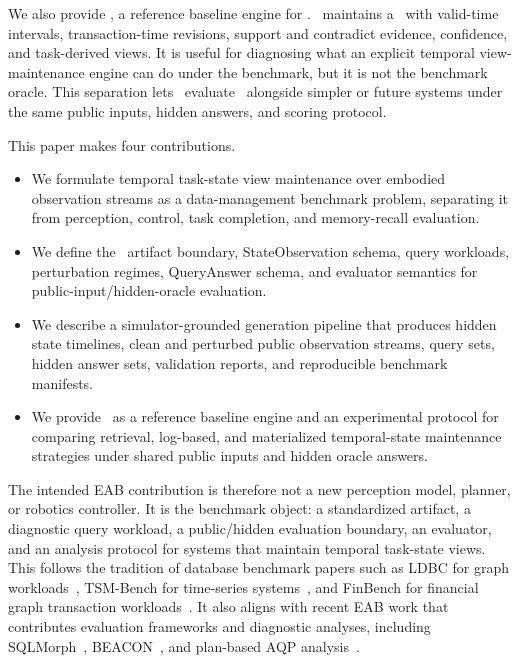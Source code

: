 We also provide \engine, a reference baseline engine for \bench. \engine\ maintains a \tsv\ with valid-time intervals, transaction-time revisions, support and contradict evidence, confidence, and task-derived views. It is useful for diagnosing what an explicit temporal view-maintenance engine can do under the benchmark, but it is not the benchmark oracle. This separation lets \bench\ evaluate \engine\ alongside simpler or future systems under the same public inputs, hidden answers, and scoring protocol.

This paper makes four contributions.
\begin{itemize}
    \item We formulate temporal task-state view maintenance over embodied observation streams as a data-management benchmark problem, separating it from perception, control, task completion, and memory-recall evaluation.
    \item We define the \bench\ artifact boundary, StateObservation schema, query workloads, perturbation regimes, QueryAnswer schema, and evaluator semantics for public-input/hidden-oracle evaluation.
    \item We describe a simulator-grounded generation pipeline that produces hidden state timelines, clean and perturbed public observation streams, query sets, hidden answer sets, validation reports, and reproducible benchmark manifests.
    \item We provide \engine\ as a reference baseline engine and an experimental protocol for comparing retrieval, log-based, and materialized temporal-state maintenance strategies under shared public inputs and hidden oracle answers.
\end{itemize}

The intended EAB contribution is therefore not a new perception model, planner, or robotics controller. It is the benchmark object: a standardized artifact, a diagnostic query workload, a public/hidden evaluation boundary, an evaluator, and an analysis protocol for systems that maintain temporal task-state views. This follows the tradition of database benchmark papers such as LDBC for graph workloads~\cite{erling2015ldbc,iosup2016ldbc}, TSM-Bench for time-series systems~\cite{khelifati2023tsmbench}, and FinBench for financial graph transaction workloads~\cite{qi2025finbench}. It also aligns with recent EAB work that contributes evaluation frameworks and diagnostic analyses, including SQLMorph~\cite{malekpour2026sqlmorph}, BEACON~\cite{najafi2025beacon}, and plan-based AQP analysis~\cite{mu2025aqp}.

